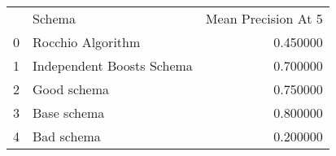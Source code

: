 \begin{tabular}{llr}
 & Schema & Mean Precision At 5 \\
0 & Rocchio Algorithm & 0.450000 \\
1 & Independent Boosts Schema & 0.700000 \\
2 & Good schema & 0.750000 \\
3 & Base schema & 0.800000 \\
4 & Bad schema & 0.200000 \\
\end{tabular}
